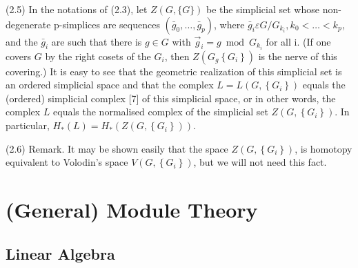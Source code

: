 (2.5) In the notations of (2.3), let $Z(G,\{G\})$ be the simplicial set whose non-degenerate p-simplices are sequences $\left(\bar{g}_0, \ldots, \bar{g}_p\right)$, where $\bar{g}_i \varepsilon G / G_{k_i}, k_0<\ldots<k_p$, and the $\bar{g}_i$ are such that there is $g \in G$ with $\vec{g}_i=g \bmod G_{k_i}$ for all i. (If one covers $G$ by the right cosets of the $G_i$, then $Z\left(G_g\left\{G_i\right\}\right)$ is the nerve of this covering.) It is easy to see that the geometric realization of this simplicial set is an ordered simplicial space and that the complex $L=L\left(G,\left\{G_i\right\}\right)$ equals the (ordered) simplicial complex [7] of this simplicial space, or in other words, the complex $L$ equals the normalised complex of the simplicial set $Z\left(G,\left\{G_i\right\}\right)$. In particular, $H_*(L)=H_*\left(Z\left(G,\left\{G_i\right\}\right)\right)$.

(2.6) Remark. It may be shown easily that the space $Z\left(G,\left\{G_i\right\}\right)$, is homotopy equivalent to Volodin's space $V\left(G,\left\{G_i\right\}\right)$, but we will not need this fact.








\chapter{(General) Module Theory}

\section{Linear Algebra}

